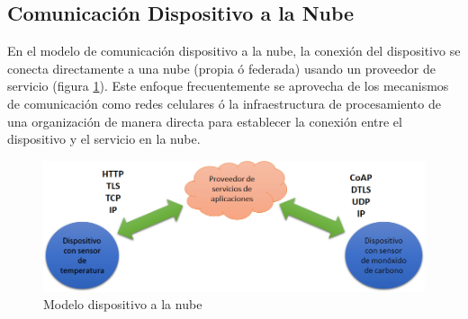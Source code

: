   
\subsection{Comunicación Dispositivo a la Nube}
En el modelo de comunicación dispositivo a la nube, la conexión del dispositivo se conecta directamente a una nube (propia ó federada) usando un proveedor de servicio (figura \ref{fig:d2n}). Este enfoque frecuentemente se aprovecha de los mecanismos de comunicación como redes celulares ó la infraestructura de procesamiento de una  organización de manera directa para establecer la conexión entre el dispositivo y el servicio en la nube.
\begin{figure}[htb]
\centering
\includegraphics[scale=0.38]{./Figuras/d2n.png}
\caption{Modelo dispositivo a la nube}
\label{fig:d2n}
\vspace*{-10pt}
\end{figure}

